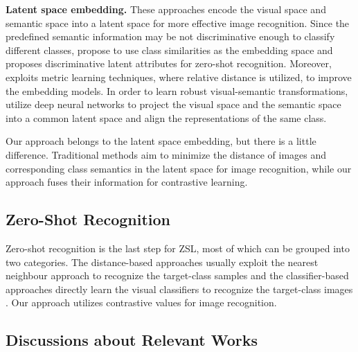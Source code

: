 \documentclass[10pt,twocolumn,letterpaper]{article}
\begin{document}
\textbf{Latent space embedding.} These approaches encode the visual space and semantic space into a latent space for more effective image recognition. Since the predefined semantic information may be not discriminative enough to classify different classes, \cite{Zhang2015ZeroShotLV,Zhang2016ZeroShotLV} propose to use class similarities as the embedding space and \cite{Jiang2017LearningDL} proposes discriminative latent attributes for zero-shot recognition. Moreover, \cite{Bucher2016ImprovingSE} exploits metric learning techniques, where relative distance is utilized, to improve the embedding models. In order to learn robust visual-semantic transformations, \cite{frome2013devise,Socher2013ZeroShotLT,Reed2016LearningDR,Morgado2017SemanticallyCR} utilize deep neural networks to project the visual space and the semantic space into a common latent space and align the representations of the same class.

Our approach belongs to the latent space embedding, but there is a little difference. Traditional methods aim to minimize the distance of images and corresponding class semantics in the latent space for image recognition, while our approach fuses their information for contrastive learning.

\subsection{Zero-Shot Recognition}

Zero-shot recognition is the last step for ZSL, most of which can be grouped into two categories. The distance-based approaches usually exploit the nearest neighbour approach to recognize the target-class samples \cite{akata2013label,Fu2015ZeroshotOR,Zhang2015ZeroShotLV,Jiang2017LearningDL} and the classifier-based approaches directly learn the visual classifiers to recognize the target-class images \cite{Changpinyo2016SynthesizedCF,xian2018feature}. Our approach utilizes contrastive values for image recognition.

\subsection{Discussions about Relevant Works}
\end{document}
